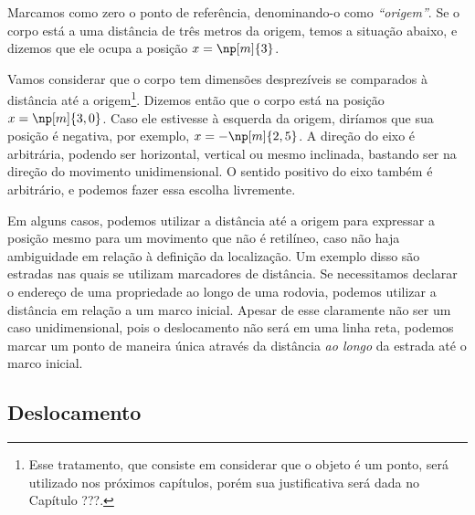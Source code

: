 
Marcamos como zero o ponto de referência, denominando-o como \emph{``origem''}. Se o corpo está a uma distância de três metros da origem, temos a situação abaixo, e dizemos que ele ocupa a posição $x = \np[m]{3}$.

\noindent{}Vamos considerar que o corpo tem dimensões desprezíveis se comparados à distância até a origem\footnote{Esse tratamento, que consiste em considerar que o objeto é um ponto, será utilizado nos próximos capítulos, porém sua justificativa será dada no Capítulo ???.}. Dizemos então que o corpo está na posição $x = \np[m]{3,0}$. Caso ele estivesse à esquerda da origem, diríamos que sua posição é negativa, por exemplo, $x = -\np[m]{2,5}$. A direção do eixo é arbitrária, podendo ser horizontal, vertical ou mesmo inclinada, bastando ser na direção do movimento unidimensional. O sentido positivo do eixo também é arbitrário, e podemos fazer essa escolha livremente.

Em alguns casos, podemos utilizar a distância até a origem para expressar a posição mesmo para um movimento que não é retilíneo, caso não haja ambiguidade em relação à definição da localização. Um exemplo disso são estradas nas quais se utilizam marcadores de distância. Se necessitamos declarar o endereço de uma propriedade ao longo de uma rodovia, podemos utilizar a distância em relação a um marco inicial. Apesar de esse claramente não ser um caso unidimensional, pois o deslocamento não será em uma linha reta, podemos marcar um ponto de maneira única através da distância \emph{ao longo} da estrada até o marco inicial.


\subsection{Deslocamento}

